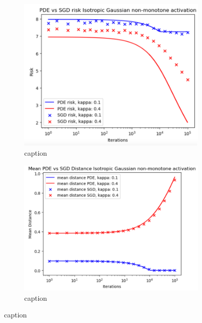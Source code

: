 \documentclass{article}
\begin{document}
    \begin{figure}[H]
\begin{subfigure}{0.5\textwidth}
  \centering
  \includegraphics[width=0.8\linewidth]{images/NGuyen2018-pde-sgd-risk-iso-gauss-non-mon.png}
  \caption{ caption}
  \label{fig: description}
\end{subfigure}%
\begin{subfigure}{0.5\textwidth}
  \centering
  \includegraphics[width=0.8\linewidth]{images/NGuyen2018-pde-sgd-iso-gauss-non-mon.png}
  \caption{ caption}
  \label{fig:  description}
\end{subfigure}
\caption{ caption}
\label{fig:  label}
\end{figure}
\end{document}
